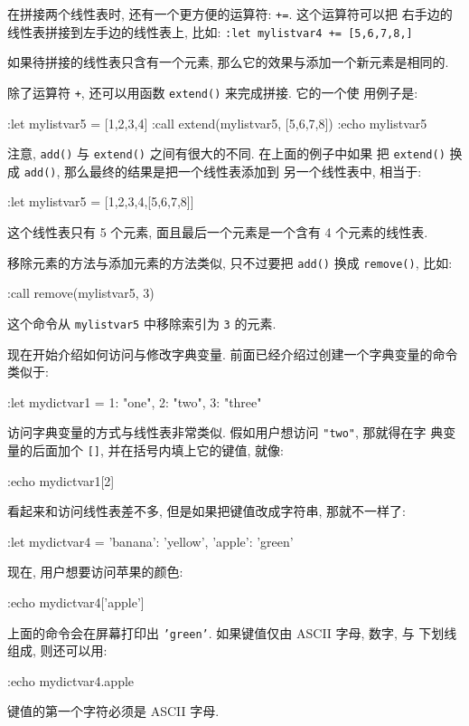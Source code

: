 \begin{warning}
    在拼接两个线性表时, 还有一个更方便的运算符: \texttt{+=}. 这个运算符可以把
    右手边的线性表拼接到左手边的线性表上, 比如: \texttt{:let mylistvar4 +=
    [5,6,7,8,]}
\end{warning}

如果待拼接的线性表只含有一个元素, 那么它的效果与添加一个新元素是相同的.

除了运算符 \texttt{+}, 还可以用函数 \texttt{extend()} 来完成拼接. 它的一个使
用例子是:
\begin{vimcode}
:let mylistvar5 = [1,2,3,4]
:call extend(mylistvar5, [5,6,7,8])
:echo mylistvar5
\end{vimcode}
注意, \texttt{add()} 与 \texttt{extend()} 之间有很大的不同. 在上面的例子中如果
把 \texttt{extend()} 换成 \texttt{add()}, 那么最终的结果是把一个线性表添加到
另一个线性表中, 相当于:
\begin{vimcode}
:let mylistvar5 = [1,2,3,4,[5,6,7,8]]
\end{vimcode}
这个线性表只有 5 个元素, 面且最后一个元素是一个含有 4 个元素的线性表.

移除元素的方法与添加元素的方法类似, 只不过要把 \texttt{add()} 换成
\texttt{remove()}, 比如:
\begin{vimcode}
:call remove(mylistvar5, 3)
\end{vimcode}
这个命令从 \texttt{mylistvar5} 中移除索引为 \texttt{3} 的元素.

现在开始介绍如何访问与修改字典变量. 前面已经介绍过创建一个字典变量的命令
类似于:
\begin{vimcode}
:let mydictvar1 = {1: "one", 2: "two", 3: "three"}
\end{vimcode}

访问字典变量的方式与线性表非常类似. 假如用户想访问 \texttt{"two"}, 那就得在字
典变量的后面加个 \texttt{[]}, 并在括号内填上它的键值, 就像:
\begin{vimcode}
:echo mydictvar1[2]
\end{vimcode}

看起来和访问线性表差不多, 但是如果把键值改成字符串, 那就不一样了:
\begin{vimcode}
:let mydictvar4 = {'banana': 'yellow', 'apple': 'green'}
\end{vimcode}
现在, 用户想要访问苹果的颜色:
\begin{vimcode}
:echo mydictvar4['apple']
\end{vimcode}
上面的命令会在屏幕打印出 \texttt{'green'}. 如果键值仅由 ASCII 字母, 数字, 与
下划线组成, 则还可以用:
\begin{vimcode}
:echo mydictvar4.apple
\end{vimcode}
键值的第一个字符必须是 ASCII 字母.

